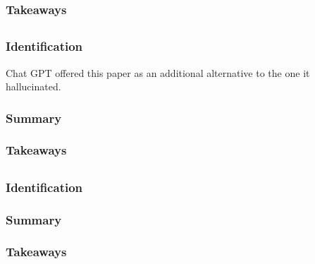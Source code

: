 \documentclass[
	letterpaper, %
]{jdf}
\begin{document}
\subsubsection{Takeaways}


\subsection{}
\subsubsection{Identification}
Chat GPT offered this paper as an additional alternative to the one it hallucinated.

\subsubsection{Summary}


\subsubsection{Takeaways}

 \subsection{\fullcite{}}
\subsubsection{Identification}


\subsubsection{Summary}


\subsubsection{Takeaways}
\end{document}

